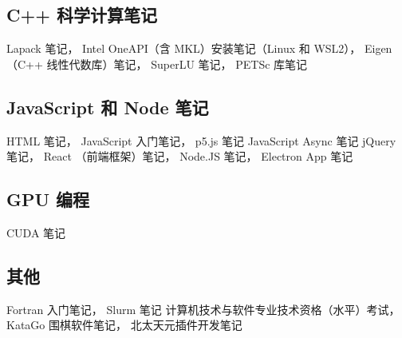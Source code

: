 \subsection{C++ 科学计算笔记}
Lapack 笔记，
Intel OneAPI（含 MKL）安装笔记（Linux 和 WSL2），
Eigen （C++ 线性代数库）笔记，
SuperLU 笔记，
PETSc 库笔记

\subsection{JavaScript 和 Node 笔记}
HTML 笔记，
JavaScript 入门笔记，
p5.js 笔记
JavaScript Async 笔记
jQuery 笔记，
React （前端框架）笔记，
Node.JS 笔记，
Electron App 笔记

\subsection{GPU 编程}
CUDA 笔记

\subsection{其他}
Fortran 入门笔记，
Slurm 笔记
计算机技术与软件专业技术资格（水平）考试，
KataGo 围棋软件笔记，
北太天元插件开发笔记
